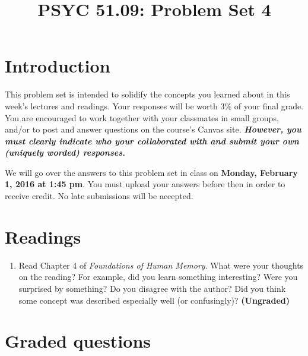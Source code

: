 \documentclass[11pt]{article}
\title{PSYC 51.09: Problem Set 4}
\date{}
\begin{document}
\maketitle
\vspace{-0.75in}
\section*{Introduction}
This problem set is intended to solidify the concepts you learned about in this week’s lectures and readings.  Your responses will be worth 3\% of your final grade.  You are encouraged to work together with your classmates in small groups, and/or to post and answer questions on the course’s Canvas site.  \textbf{\textit{However, you must clearly indicate who your collaborated with and submit your own (uniquely worded) responses.}}

We will go over the answers to this problem set in class on \textbf{Monday, February 1, 2016 at 1:45 pm}.  You must upload your answers before then in order to receive credit.  No late submissions will be accepted.

\section*{Readings}
\begin{enumerate}
\item Read Chapter 4 of \textit{Foundations of Human Memory}.  What were your thoughts on the reading?  For example, did you learn something interesting?  Were you surprised by something?  Do you disagree with the author?  Did you think some concept was described especially well (or confusingly)?  \textbf{(Ungraded)}
\end{enumerate}

\section*{Graded questions}
\end{document}
